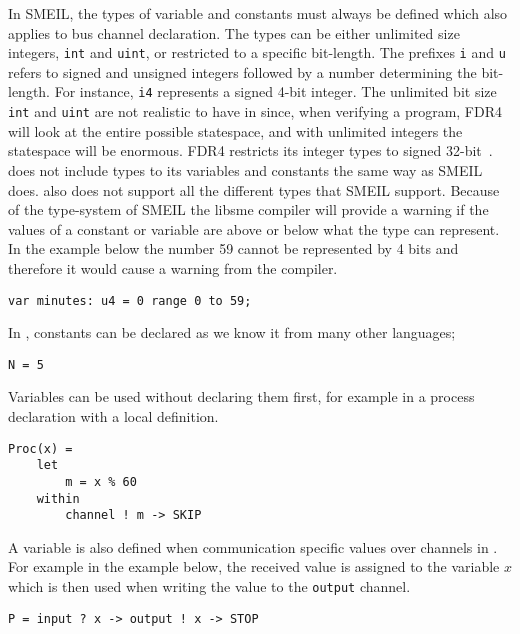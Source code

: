 In SMEIL, the types of variable and constants must always be defined which also applies to bus channel declaration. The types can be either unlimited size integers, \texttt{int} and \texttt{uint}, or restricted to a specific bit-length. The prefixes \texttt{i} and \texttt{u} refers to signed and unsigned integers followed by a number determining the bit-length. For instance, \texttt{i4} represents a signed 4-bit integer.
The unlimited bit size \texttt{int} and \texttt{uint} are not realistic to have in \cspm{} since, when verifying a program, FDR4 will look at the entire possible statespace, and with unlimited integers the statespace will be enormous. FDR4 restricts its integer types to signed 32-bit~\cite{UniversityofOxford}.
\cspm{} does not include types to its variables and constants the same way as SMEIL does. \cspm{} also does not support all the different types that SMEIL support.
Because of the type-system of SMEIL the libsme compiler will provide a warning if the values of a constant or variable are above or below what the type can represent. In the example below the number 59 cannot be represented by 4 bits and therefore it would cause a warning from the compiler.
\begin{verbatim}
var minutes: u4 = 0 range 0 to 59;
\end{verbatim}
In \cspm, constants can be declared as we know it from many other languages;
\begin{verbatim}
N = 5
\end{verbatim}
Variables can be used without declaring them first, for example in a process declaration with a local definition.
\begin{verbatim}
Proc(x) =
    let
        m = x % 60
    within
        channel ! m -> SKIP
\end{verbatim}
A variable is also defined when communication specific values over channels in \cspm. For example in the example below, the received value is assigned to the variable $x$ which is then used when writing the value to the \texttt{output} channel.
\begin{verbatim}
P = input ? x -> output ! x -> STOP
\end{verbatim}

